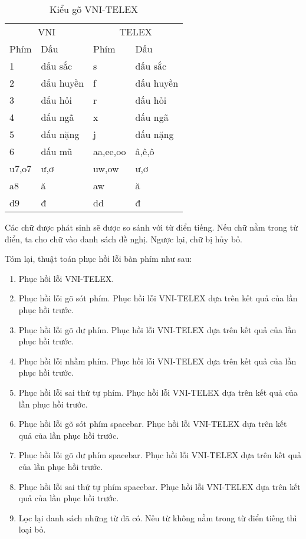 \documentclass[a4paper,oneside,14pt]{extbook} %
\begin{document}
\begin{table}[htbp]
  \centering
  \begin{tabular}{ll|ll}
    \multicolumn{2}{c}{VNI}&\multicolumn{2}{c}{TELEX}\\
    Phím&Dấu&Phím&Dấu\\\hline
    1&dấu sắc&s&dấu sắc\\
    2&dấu huyền&f&dấu huyền\\
    3&dấu hỏi&r&dấu hỏi\\
    4&dấu ngã&x&dấu ngã\\
    5&dấu nặng&j&dấu nặng\\
    6&dấu mũ&aa,ee,oo&â,ê,ô\\
    u7,o7&ư,ơ&uw,ow&ư,ơ\\
    a8&ă&aw&ă\\
    d9&đ&dd&đ\\
  \end{tabular}
  \caption{Kiểu gõ VNI-TELEX}
  \label{tab:vni-telex}
\end{table}


Các chữ được phát sinh sẽ được so sánh với từ điển tiếng. Nếu chữ nằm trong từ
điển, ta cho chữ vào danh sách đề nghị. Ngược lại, chữ bị hủy bỏ.

Tóm lại, thuật toán phục hồi lỗi bàn phím như sau:
\begin{algo}\caption{Phục hồi lỗi bàn phím}
  \begin{enumerate}
  \item Phục hồi lỗi VNI-TELEX.
  \item Phục hồi lỗi gõ sót phím. Phục hồi lỗi VNI-TELEX dựa trên kết
    quả của lần phục hồi trước.
  \item Phục hồi lỗi gõ dư phím. Phục hồi lỗi VNI-TELEX dựa trên kết
    quả của lần phục hồi trước.
  \item Phục hồi lỗi nhầm phím. Phục hồi lỗi VNI-TELEX dựa trên kết
    quả của lần phục hồi trước.
  \item Phục hồi lỗi sai thứ tự phím. Phục hồi lỗi VNI-TELEX dựa trên kết
    quả của lần phục hồi trước.
  \item Phục hồi lỗi gõ sót phím spacebar. Phục hồi lỗi VNI-TELEX dựa trên kết
    quả của lần phục hồi trước.
  \item Phục hồi lỗi gõ dư phím spacebar. Phục hồi lỗi VNI-TELEX dựa trên kết
    quả của lần phục hồi trước.
  \item Phục hồi lỗi sai thứ tự phím spacebar. Phục hồi lỗi VNI-TELEX dựa trên kết
    quả của lần phục hồi trước.
  \item Lọc lại danh sách những từ đã có. Nếu từ không nằm trong từ
    điển tiếng thì loại bỏ.
  \end{enumerate}
\end{algo}
\end{document}
